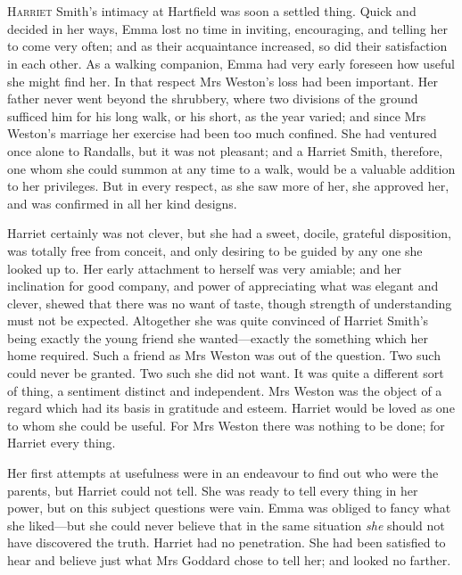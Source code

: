 \chapter[Chapter \thechapter]{}
\lettrine[lraise=0.3]{H}{arriet} Smith's intimacy at Hartfield was soon a settled thing. Quick and decided in her ways, Emma lost no time in inviting, encouraging, and telling her to come very often; and as their acquaintance increased, so did their satisfaction in each other. As a walking companion, Emma had very early foreseen how useful she might find her. In that respect Mrs Weston's loss had been important. Her father never went beyond the shrubbery, where two divisions of the ground sufficed him for his long walk, or his short, as the year varied; and since Mrs Weston's marriage her exercise had been too much confined. She had ventured once alone to Randalls, but it was not pleasant; and a Harriet Smith, therefore, one whom she could summon at any time to a walk, would be a valuable addition to her privileges. But in every respect, as she saw more of her, she approved her, and was confirmed in all her kind designs.

Harriet certainly was not clever, but she had a sweet, docile, grateful disposition, was totally free from conceit, and only desiring to be guided by any one she looked up to. Her early attachment to herself was very amiable; and her inclination for good company, and power of appreciating what was elegant and clever, shewed that there was no want of taste, though strength of understanding must not be expected. Altogether she was quite convinced of Harriet Smith's being exactly the young friend she wanted—exactly the something which her home required. Such a friend as Mrs Weston was out of the question. Two such could never be granted. Two such she did not want. It was quite a different sort of thing, a sentiment distinct and independent. Mrs Weston was the object of a regard which had its basis in gratitude and esteem. Harriet would be loved as one to whom she could be useful. For Mrs Weston there was nothing to be done; for Harriet every thing.

Her first attempts at usefulness were in an endeavour to find out who were the parents, but Harriet could not tell. She was ready to tell every thing in her power, but on this subject questions were vain. Emma was obliged to fancy what she liked—but she could never believe that in the same situation \textit{she} should not have discovered the truth. Harriet had no penetration. She had been satisfied to hear and believe just what Mrs Goddard chose to tell her; and looked no farther.

